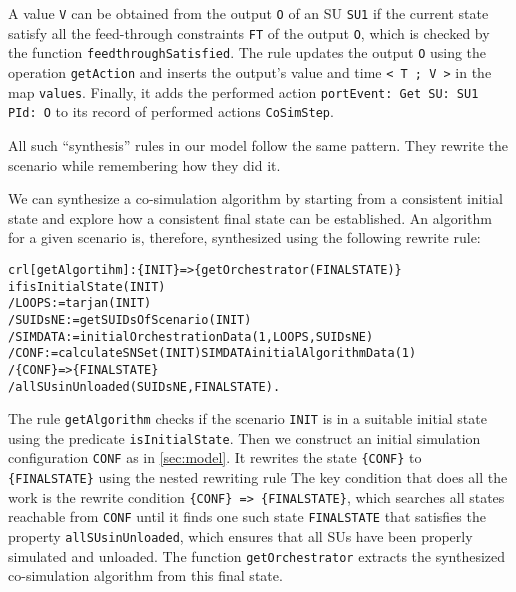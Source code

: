 A value \texttt{V} can be obtained from the output \texttt{O} of an SU \texttt{SU1} if the current state satisfy all the feed-through constraints \texttt{FT} of the output \texttt{O}, which is checked by the function \texttt{feedthroughSatisfied}.
The rule updates the output \texttt{O} using the operation \texttt{getAction} and inserts the output's value and time \texttt{< T ; V >} in the map \texttt{values}.
Finally, it adds the performed action \texttt{portEvent: Get SU: SU1 PId: O} to its record of performed actions \texttt{CoSimStep}.

All such ``synthesis'' rules in our model follow the same pattern.
They rewrite the scenario while remembering how they did it.

We can synthesize a co-simulation algorithm by starting from a consistent initial state and explore how a consistent final state can be established.
An algorithm for a given scenario is, therefore, synthesized using the following rewrite rule:

\small
\begin{alltt}
crl [getAlgortihm]: \{INIT\} => \{getOrchestrator(FINALSTATE)\}
if isInitialState(INIT)
  / LOOPS := tarjan(INIT)
  / SUIDsNE := getSUIDsOfScenario(INIT)
  / SIMDATA := initialOrchestrationData(1,LOOPS,SUIDsNE)
  / CONF := calculateSNSet(INIT) SIMDATA initialAlgorithmData(1)
  / \{CONF\} => \{FINALSTATE\} 
  / allSUsinUnloaded(SUIDsNE, FINALSTATE) .
\end{alltt}
\normalsize

The rule \texttt{getAlgorithm} checks if the scenario \texttt{INIT} is in a suitable initial state using the predicate \texttt{isInitialState}.
Then we construct an initial simulation configuration \texttt{CONF} as in \cref{sec:model}.
It rewrites the state \texttt{\{CONF\}} to \texttt{\{FINALSTATE\}} using the nested rewriting rule 
The key condition that does all the work is the rewrite condition \texttt{\{CONF\} => \{FINALSTATE\}}, which searches all states reachable from \texttt{CONF} until it finds one such state \texttt{FINALSTATE} that satisfies the property \texttt{allSUsinUnloaded}, which ensures that all SUs have been properly simulated and unloaded.
The function \texttt{getOrchestrator} extracts the synthesized co-simulation algorithm from this final state.

